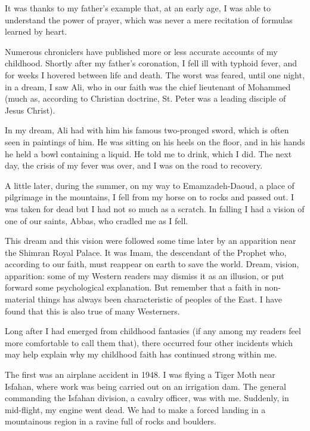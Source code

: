 It was thanks to my father’s example that, at an early age, I was able to understand the power of prayer, which was never a mere recitation of formulas learned by heart. 

Numerous chroniclers have published more or less accurate accounts of my childhood. Shortly after my father’s coronation, I fell ill with typhoid fever, and for weeks I hovered between life and death. The worst was feared, until one night, in a dream, I saw Ali, who in our faith was the chief lieutenant of Mohammed (much as, according to Christian doctrine, St. Peter was a leading disciple of Jesus Christ). 

In my dream, Ali had with him his famous two-pronged sword, which is often seen in paintings of him. He was sitting on his heels on the floor, and in his hands he held a bowl containing a liquid. He told me to drink, which I did. The next day, the crisis of my fever was over, and I was on the road to recovery. 

A little later, during the summer, on my way to Emamzadeh-Daoud, a place of pilgrimage in the mountains, I fell from my horse on to rocks and passed out. I was taken for dead but I had not so much as a scratch. In falling I had a vision of one of our saints, Abbas, who cradled me as I fell. 

This dream and this vision were followed some time later by an apparition near the Shimran Royal Palace. It was Imam, the descendant of the Prophet who, according to our faith, must reappear on earth to save the world. Dream, vision, apparition: some of my Western readers may dismiss it as an illusion, or put forward some psychological explanation. But remember that a faith in non-material things has always been characteristic of peoples of the East. I have found that this is also true of many Westerners. 

Long after I had emerged from childhood fantasies (if any among my readers feel more comfortable to call them that), there occurred four other incidents which may help explain why my childhood faith has continued strong within me. 

The first was an airplane accident in 1948. I was flying a Tiger Moth near Isfahan, where work was being carried out on an irrigation dam. The general commanding the Isfahan division, a cavalry officer, was with me. Suddenly, in mid-flight, my engine went dead. We had to make a forced landing in a mountainous region in a ravine full of rocks and boulders. 

